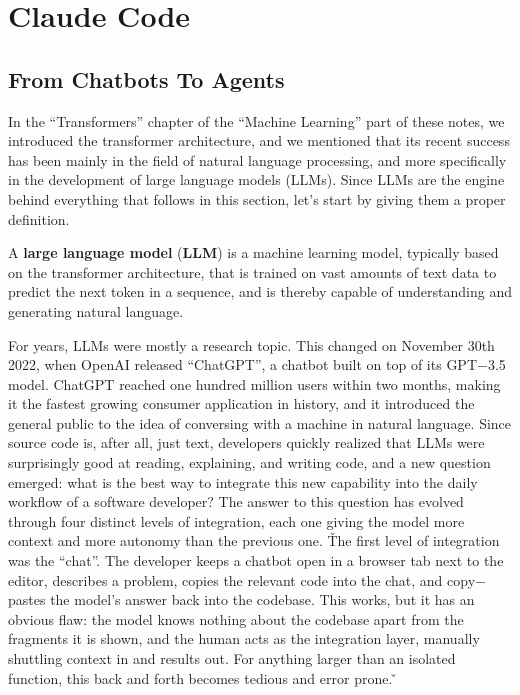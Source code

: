 \section{Claude Code}\label{sec:claude_code}


\subsection{From Chatbots To Agents}

In the ``Transformers'' chapter of the ``Machine Learning'' part of these notes, we introduced the transformer
architecture, and we mentioned that its recent success has been mainly in the field of natural language processing,
and more specifically in the development of large language models (LLMs). Since LLMs are the engine behind everything
that follows in this section, let's start by giving them a proper definition.

A \textbf{large language model} (\textbf{LLM}) is a machine learning model, typically based on the transformer
architecture, that is trained on vast amounts of text data to predict the next token in a sequence, and is thereby
capable of understanding and generating natural language.
\ed

For years, LLMs were mostly a research topic. This changed on November 30th 2022, when OpenAI released ``ChatGPT'', a
chatbot built on top of its GPT$-$3.5 model. ChatGPT reached one hundred million users within two months, making it
the fastest growing consumer application in history, and it introduced the general public to the idea of conversing
with a machine in natural language. Since source code is, after all, just text, developers quickly realized that LLMs
were surprisingly good at reading, explaining, and writing code, and a new question emerged: what is the best way to
integrate this new capability into the daily workflow of a software developer? The answer to this question has evolved
through four distinct levels of integration, each one giving the model more context and more autonomy than the
previous one. \v

The first level of integration was the ``chat''. The developer keeps a chatbot open in a browser tab next to the
editor, describes a problem, copies the relevant code into the chat, and copy$-$pastes the model's answer back into
the codebase. This works, but it has an obvious flaw: the model knows nothing about the codebase apart from the
fragments it is shown, and the human acts as the integration layer, manually shuttling context in and results out.
For anything larger than an isolated function, this back and forth becomes tedious and error prone. \v

